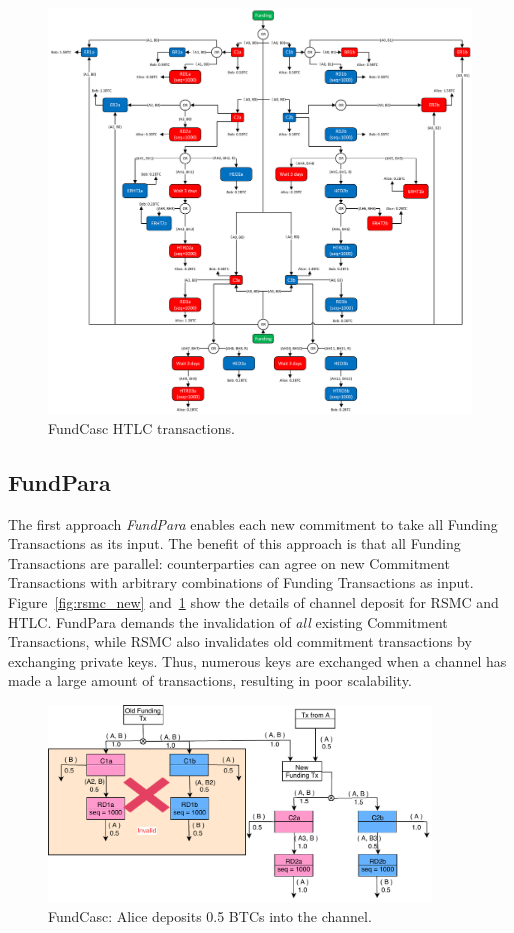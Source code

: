 \begin{figure}[t]
\centering
\includegraphics[width=6in]{figs/htlc_new.pdf}
\vspace{-6pt}
\caption{FundCasc HTLC transactions.}
\label{fig:htlc_new}
\end{figure}

\subsection{FundPara}


The first approach {\em FundPara} enables each new commitment to take all Funding Transactions as its input. The benefit of this approach is that all Funding Transactions are parallel: counterparties can agree on new Commitment
Transactions with arbitrary combinations of Funding Transactions as input.
Figure~\ref{fig:rsmc_new} and~\ref{fig:htlc_new} show the details of channel
deposit for RSMC and HTLC. FundPara demands the invalidation of {\em all} existing Commitment Transactions, while RSMC also invalidates old commitment transactions by exchanging private keys. Thus, numerous keys are exchanged when a channel has made a large amount of transactions, resulting in poor scalability.

\begin{figure}[t]
\centering
\includegraphics[width=4in]{figs/splice_in.pdf}
\vspace{-6pt}
\caption{FundCasc: Alice deposits 0.5 BTCs into the channel.}
\label{fig:splice_in}
\end{figure}

